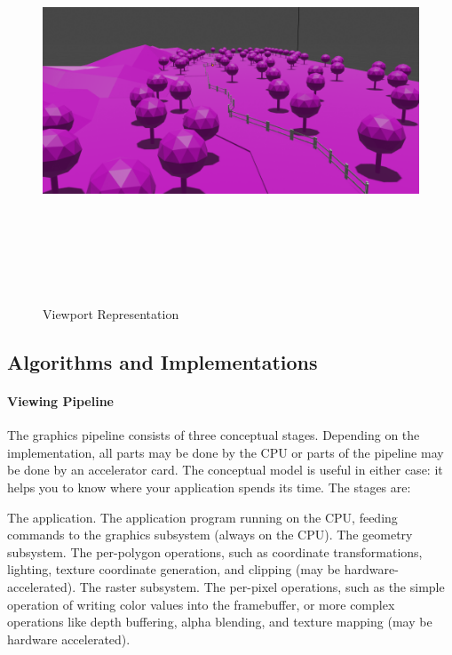 \documentclass{report}
\begin{document}
    \medskip
    \begin{figure}[h!]
      \centering
        \includegraphics[width=12cm,height=12cm,keepaspectratio]{development-shading.png}
        \caption{Viewport Representation}
    \end{figure}

\subsection{Algorithms and Implementations}
    \paragraph{Viewing Pipeline}
         The graphics pipeline consists of three conceptual stages. Depending on the implementation, all parts may be done by the CPU or parts of the pipeline may be done by an accelerator card. The conceptual model is useful in either case: it helps you to know where your application spends its time. The stages are:

    The application. The application program running on the CPU, feeding commands to the graphics 
    subsystem (always on the CPU).
    The geometry subsystem. The per-polygon operations, such as coordinate transformations, lighting, 
    texture coordinate generation, and clipping (may be hardware-accelerated).
    The raster subsystem. The per-pixel operations, such as the simple operation of writing color 
    values into the framebuffer, or more complex operations like depth buffering, alpha blending, and 
    texture mapping (may be hardware accelerated). 
\end{document}
